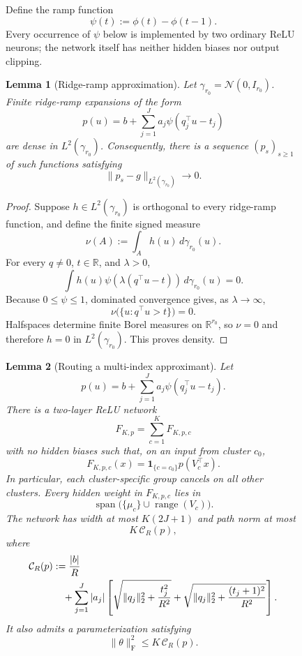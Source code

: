 \documentclass{article}
\newtheorem{lemma}[lemma]{Lemma}
\begin{document}
\begin{figure}
Define the ramp function
\[
    \psi(t):=\phi(t)-\phi(t-1).
\]
Every occurrence of $\psi$ below is implemented by two ordinary ReLU
neurons; the network itself has neither hidden biases nor output clipping.

\begin{lemma}[Ridge-ramp approximation]
\label{lem:ridge-ramp-density}
Let $\gamma_{r_0}=\mathcal N(0,I_{r_0})$. Finite ridge-ramp expansions of the form
\[
    p(u)=b+\sum_{j=1}^J a_j\psi(q_j^\top u-t_j)
\]
are dense in $L^2(\gamma_{r_0})$. Consequently, there is a sequence
$(p_s)_{s\geq1}$ of such functions satisfying
\[
    \|p_s-g\|_{L^2(\gamma_{r_0})}\longrightarrow0.
\]
\end{lemma}

\begin{proof}
Suppose $h\in L^2(\gamma_{r_0})$ is orthogonal to every ridge-ramp function,
and define the finite signed measure
\[
    \nu(A):=\int_A h(u)\,d\gamma_{r_0}(u).
\]
For every $q\neq0$, $t\in\mathbb R$, and $\lambda>0$,
\[
    \int h(u)\psi\!\left(\lambda(q^\top u-t)\right)
        \,d\gamma_{r_0}(u)=0.
\]
Because $0\leq\psi\leq1$, dominated convergence gives, as
$\lambda\to\infty$,
\[
    \nu\bigl(\{u:q^\top u>t\}\bigr)=0.
\]
Halfspaces determine finite Borel measures on $\mathbb R^{r_0}$, so
$\nu=0$ and therefore $h=0$ in $L^2(\gamma_{r_0})$. This proves density.
\end{proof}

\begin{lemma}[Routing a multi-index approximant]
\label{lem:routed-multi-index-approximant}
\label{lem:exact-specialized-mlp}
Let
\[
    p(u)=b+\sum_{j=1}^J a_j\psi(q_j^\top u-t_j).
\]
There is a two-layer ReLU network
\[
    F_{K,p}=\sum_{c=1}^K F_{K,p,c}
\]
with no hidden biases such that, on an input from cluster $c_0$,
\[
    F_{K,p,c}(x)
    =\mathbf 1_{\{c=c_0\}}p(V_c^\top x).
\]
In particular, each cluster-specific group cancels on all other clusters.
Every hidden weight in $F_{K,p,c}$ lies in
\[
    \operatorname{span}\bigl(\{\mu_c\}\cup\operatorname{range}(V_c)\bigr).
\]
The network has width at most $K(2J+1)$ and path norm at most
\[
    K\,\mathcal C_R(p),
\]
where
\begin{align*}
    \mathcal C_R(p)
    &:={|b|\over R}\\
    &\quad+
    \sum_{j=1}^J |a_j|
    \left[
        \sqrt{\|q_j\|_2^2+{t_j^2\over R^2}}
        +
        \sqrt{\|q_j\|_2^2+{(t_j+1)^2\over R^2}}
    \right].
\end{align*}
It also admits a parameterization satisfying
\[
    \|\theta\|_{\mathrm F}^2\leq K\,\mathcal C_R(p).
\]
\end{lemma}


\end{figure}
\end{document}
